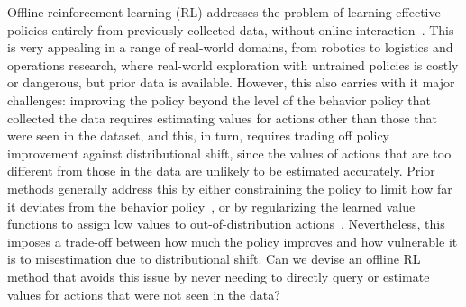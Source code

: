 \documentclass{article} %
\begin{document}
Offline reinforcement learning (RL) addresses the problem of learning effective policies entirely from previously collected data, without online interaction~\citep{fujimoto2019off, lange2012batch}. This is very appealing in a range of real-world domains, from robotics to logistics and operations research, where real-world exploration with untrained policies is costly or dangerous, but prior data is available. However, this also carries with it major challenges: improving the policy beyond the level of the behavior policy that collected the data requires estimating values for actions other than those that were seen in the dataset, and this, in turn, requires trading off policy improvement against distributional shift, since the values of actions that are too different from those in the data are unlikely to be estimated accurately. Prior methods generally address this by either constraining the policy to limit how far it deviates from the behavior policy~\citep{fujimoto2019off, wu2019behavior, fujimoto2021minimalist, kumar2019stabilizing, nair2020awac, wang2020critic}, or by regularizing the learned value functions to assign low values to out-of-distribution actions~\citep{kumar2020conservative, kostrikov2021offline}. Nevertheless, this imposes a trade-off between how much the policy improves and how vulnerable it is to misestimation due to distributional shift. Can we devise an offline RL method that avoids this issue by never needing to directly query or estimate values for actions that were not seen in the data?
\end{document}
